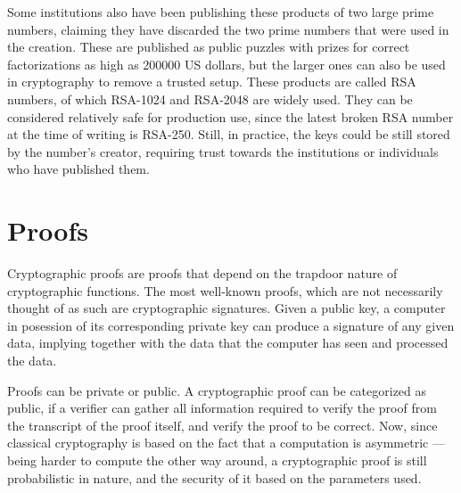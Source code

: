 Some institutions also have been publishing these products of two large prime numbers, claiming they have discarded the two prime numbers that were used in the creation. These are published as public puzzles with prizes for correct factorizations as high as 200000 US dollars, but the larger ones can also be used in cryptography to remove a trusted setup. These products are called RSA numbers, of which RSA-1024 and RSA-2048 are widely used. They can be considered relatively safe for production use, since the latest broken RSA number at the time of writing is RSA-250. Still, in practice, the keys could be still stored by the number's creator, requiring trust towards the institutions or individuals who have published them.

\section{Proofs}
Cryptographic proofs are proofs that depend on the trapdoor nature of cryptographic functions. The most well-known proofs, which are not necessarily thought of as such are cryptographic signatures. Given a public key, a computer in posession of its corresponding private key can produce a signature of any given data, implying together with the data that the computer has seen and processed the data.

Proofs can be private or public. A cryptographic proof can be categorized as public, if a verifier can gather all information required to verify the proof from the transcript of the proof itself, and verify the proof to be correct. Now, since classical cryptography is based on the fact that a computation is asymmetric --- being harder to compute the other way around, a cryptographic proof is still probabilistic in nature, and the security of it based on the parameters used.
